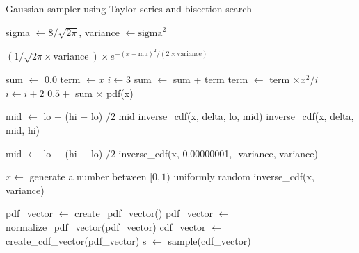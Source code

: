 \begin{algorithm}[H]
    \caption{Gaussian sampler using Taylor series and bisection search}
    \begin{algorithmic}[1]
        \State sigma $\leftarrow 8 / \sqrt{2  \pi}$, variance $\leftarrow \text{sigma}^2$
        \item[] 
            \Return $(1/\sqrt{2 \pi \times \text{variance}}) \times e^{-{(x - \text{mu})}^2 / (2 \times \text{variance})}$
        \EndFunction
        \item[] 
            \EndIf
            \State sum $\leftarrow$ 0.0
            \State term $\leftarrow x$
            \State $i \leftarrow 3$
                \State sum $\leftarrow$ sum + term
                \State term $\leftarrow$ term $\times x^2 / i$
                \State $i \leftarrow i + 2$
            \EndWhile
            \Return $0.5 + $ sum $\times$ pdf(x)
        \EndFunction
        \item[] 
            \State mid $\leftarrow$ lo $+$ (hi $-$ lo) $/ 2$
             \Return mid
                \State \Return inverse\_cdf(x, delta, lo, mid)
            \Else \text{ }
                \State \Return inverse\_cdf(x, delta, mid, hi)
            \EndIf
        \EndFunction
        \item[] 
            \State mid $\leftarrow$ lo $+$ (hi $-$ lo) $/ 2$
            \State \Return inverse\_cdf(x, 0.00000001, -variance, variance)
        \EndFunction
    \end{algorithmic}
\end{algorithm}



\begin{algorithm}[H]
    \begin{algorithmic}
        \item[] 
            \State $x \leftarrow $ generate a number between $[0, 1)$ uniformly random
            \State \Return inverse\_cdf(x, variance)
        \EndFunction
        \item[] 
        \State pdf\_vector $\leftarrow$ create\_pdf\_vector()
        \State pdf\_vector $\leftarrow$ normalize\_pdf\_vector(pdf\_vector)
        \State cdf\_vector $\leftarrow$ create\_cdf\_vector(pdf\_vector)
        \State s $\leftarrow$ sample(cdf\_vector)
    \end{algorithmic}
\end{algorithm}

